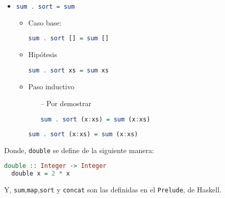 \documentclass[spanish,12pt,letterpaper]{article}
\begin{document}
\begin{itemize}
\item
  \begin{lstlisting}[language=Haskell]
    sum . sort = sum
  \end{lstlisting}
  \begin{itemize}
    \item Caso base:
    \begin{lstlisting}[language=Haskell]
      sum . sort [] = sum []
    \end{lstlisting}
  \item Hipótesis
    \begin{lstlisting}[language=Haskell]
      sum . sort xs = sum xs
    \end{lstlisting}
  \item Paso inductivo
    \begin{itemize}
    \item [--] Por demostrar
      \begin{lstlisting}[language=Haskell]
        sum . sort (x:xs) = sum (x:xs)
      \end{lstlisting}
    \end{itemize}
    \begin{lstlisting}[language=Haskell]
      sum . sort (x:xs) = sum (x:xs)
    \end{lstlisting}
  \end{itemize}
  
\end{itemize}
Donde, \texttt{double} se define de la siguiente manera:
\begin{lstlisting}[language=Haskell]
  double :: Integer -> Integer
  double x = 2 * x
\end{lstlisting}
Y, \texttt{sum},\texttt{map},\texttt{sort} y \texttt{concat} son las definidas en
el \texttt{Prelude}, de Haskell.
\end{document}
